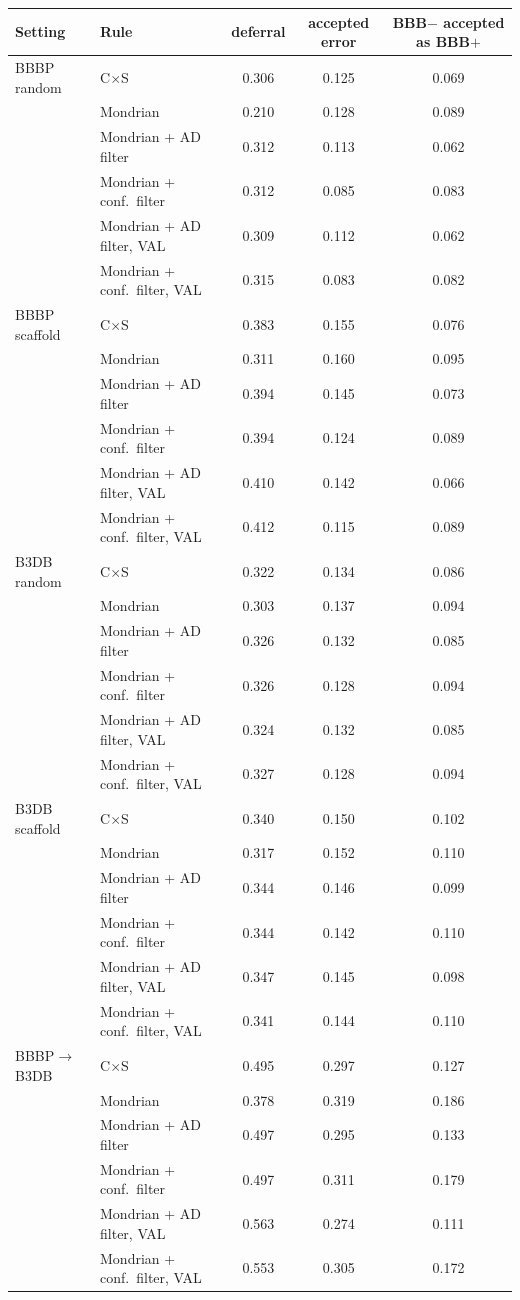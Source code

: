 \begin{tabular}{llccc}
\toprule
Setting & Rule & deferral & accepted error & BBB$-$ accepted as BBB$+$\\
\midrule
BBBP random & C$\times$S & 0.306 & 0.125 & 0.069\\
 & Mondrian & 0.210 & 0.128 & 0.089\\
 & Mondrian + AD filter & 0.312 & 0.113 & 0.062\\
 & Mondrian + conf.\ filter & 0.312 & 0.085 & 0.083\\
 & Mondrian + AD filter, VAL & 0.309 & 0.112 & 0.062\\
 & Mondrian + conf.\ filter, VAL & 0.315 & 0.083 & 0.082\\
\midrule
BBBP scaffold & C$\times$S & 0.383 & 0.155 & 0.076\\
 & Mondrian & 0.311 & 0.160 & 0.095\\
 & Mondrian + AD filter & 0.394 & 0.145 & 0.073\\
 & Mondrian + conf.\ filter & 0.394 & 0.124 & 0.089\\
 & Mondrian + AD filter, VAL & 0.410 & 0.142 & 0.066\\
 & Mondrian + conf.\ filter, VAL & 0.412 & 0.115 & 0.089\\
\midrule
B3DB random & C$\times$S & 0.322 & 0.134 & 0.086\\
 & Mondrian & 0.303 & 0.137 & 0.094\\
 & Mondrian + AD filter & 0.326 & 0.132 & 0.085\\
 & Mondrian + conf.\ filter & 0.326 & 0.128 & 0.094\\
 & Mondrian + AD filter, VAL & 0.324 & 0.132 & 0.085\\
 & Mondrian + conf.\ filter, VAL & 0.327 & 0.128 & 0.094\\
\midrule
B3DB scaffold & C$\times$S & 0.340 & 0.150 & 0.102\\
 & Mondrian & 0.317 & 0.152 & 0.110\\
 & Mondrian + AD filter & 0.344 & 0.146 & 0.099\\
 & Mondrian + conf.\ filter & 0.344 & 0.142 & 0.110\\
 & Mondrian + AD filter, VAL & 0.347 & 0.145 & 0.098\\
 & Mondrian + conf.\ filter, VAL & 0.341 & 0.144 & 0.110\\
\midrule
BBBP$\to$B3DB & C$\times$S & 0.495 & 0.297 & 0.127\\
 & Mondrian & 0.378 & 0.319 & 0.186\\
 & Mondrian + AD filter & 0.497 & 0.295 & 0.133\\
 & Mondrian + conf.\ filter & 0.497 & 0.311 & 0.179\\
 & Mondrian + AD filter, VAL & 0.563 & 0.274 & 0.111\\
 & Mondrian + conf.\ filter, VAL & 0.553 & 0.305 & 0.172\\
\bottomrule
\end{tabular}
